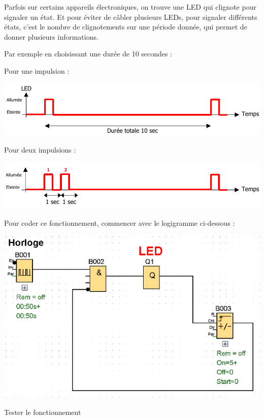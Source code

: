 \documentclass[11pt]{article}
\begin{document}
\begin{UPSTIactivite}
    Parfois sur certains appareils électroniques, on trouve une LED qui clignote pour signaler un
état. Et pour éviter de câbler plusieurs LEDs, pour signaler différents états, c’est le nombre de
clignotements sur une période donnée, qui permet de donner plusieurs informations.

Par exemple en choisissant une durée de 10 secondes :

\begin{minipage}{.3\textwidth}
    Pour une impulsion : 
\end{minipage}
\begin{minipage}{.6\textwidth}
    \includegraphics[width=\textwidth]{images/chrono_un_bip.png}
\end{minipage}

\begin{minipage}{.3\textwidth}
    Pour deux impulsions : 
\end{minipage}
\begin{minipage}{.6\textwidth}
    \includegraphics[width=\textwidth]{images/chrono_deux_bips.png}
\end{minipage}


Pour coder ce fonctionnement, commencer avec le logigramme ci-dessous : 

\begin{center}
    \includegraphics[width=.4\textwidth]{images/compteur_1.png}
\end{center}

Tester le fonctionnement 


\end{UPSTIactivite}
\end{document}
